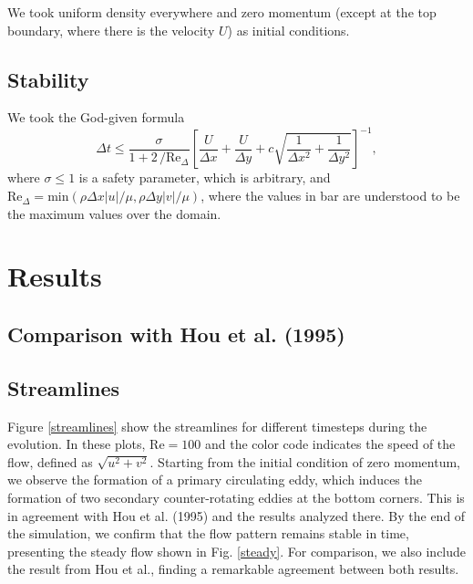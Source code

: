 \documentclass[11pt]{article}
\newcommand{\Rey}{\text{Re}}
\begin{document}
We took uniform density everywhere and zero momentum (except at the top boundary, where there is the velocity $U$) as initial conditions.

\subsection{Stability}

We took the God-given formula
\begin{equation}
 \Delta t \leq \frac{\sigma}{1 + 2\,/\Rey_\Delta}\left[ \frac{U}{\Delta x} + \frac{U}{\Delta y} + c\sqrt{\frac{1}{\Delta x^2} + \frac{1}{\Delta y^2}} \right]^{-1},
\end{equation}
where $\sigma \leq 1$ is a safety parameter, which is arbitrary, and $\Rey_\Delta = \text{min}(\rho\Delta x|u|/\mu, \rho\Delta y|v|/\mu)$, where the values in bar are understood to be
the maximum values over the domain.


\section{Results}

\subsection{Comparison with Hou et al. (1995)}


\subsection{Streamlines}

Figure \ref{streamlines} show the streamlines for different timesteps during the evolution. In these plots, $\Rey = 100$ and the color code indicates the speed of the flow, defined as $\sqrt{u^2 + v^2}$. Starting from the initial condition of zero momentum, we observe the formation of a primary circulating eddy, which induces the formation of two secondary counter-rotating eddies at the bottom corners. This is in agreement with Hou et al. (1995) and the results analyzed there. By the end of the simulation, we confirm that the flow pattern remains stable in time, presenting the steady flow shown in Fig. \ref{steady}. For comparison, we also include the result from Hou et al., finding a remarkable agreement between both results.
\end{document}
